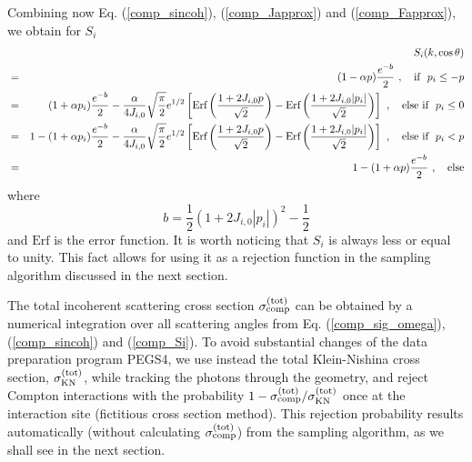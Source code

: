 Combining now Eq. (\ref{comp_sincoh}), (\ref{comp_Japprox}) and
(\ref{comp_Fapprox}),  we obtain for $S_i$
\begin{eqnarray}
\label{comp_Si}
& & S_i(k,\cos \theta) \nonumber \\
& = & (1 - \alpha p) {e^{-b} \over 2}~,\quad \mbox{if}~~p_i \le -p \nonumber \\
& = &
(1 + \alpha p_i) {e^{-b} \over 2} - {\alpha \over 4 J_{i,0}}
\sqrt{{\pi \over 2}} e^{1/2} \left[ \mbox{Erf} \left( 1 + 2 J_{i,0} p \over
\sqrt{2} \right) - \mbox{Erf} \left(  1 + 2 J_{i,0} |p_i|
\over \sqrt{2} \right) \right]~,\quad \mbox{else if}~~ p_i \le 0 \nonumber \\
& = &
1 - (1 + \alpha p_i) {e^{-b} \over 2} - {\alpha \over 4 J_{i,0}}
\sqrt{{\pi \over 2}} e^{1/2} \left[ \mbox{Erf} \left( 1 + 2 J_{i,0} p \over
\sqrt{2} \right) - \mbox{Erf} \left(  1 + 2 J_{i,0} |p_i|
\over \sqrt{2} \right) \right] ~,\quad \mbox{else if}~~ p_i < p \nonumber \\
& = &
1 - (1 + \alpha p) {e^{-b} \over 2} ~,\quad \mbox{else}
\end{eqnarray}
where
\begin{equation}
b = \frac{1}{2}\left(1 + 2 J_{i,0} |p_i| \right)^2 - \frac{1}{2}
\end{equation}
and $\mbox{Erf}$ is the error function. It is worth noticing that
$S_i$ is always less or equal to unity. This fact allows for
using it as a rejection function in the sampling algorithm discussed
in the next section.

The total incoherent scattering cross section $\sigma_{\rm comp}^{\rm (tot)}$
can be obtained
by a numerical integration over all scattering angles from
Eq. (\ref{comp_sig_omega}), (\ref{comp_sincoh}) and
(\ref{comp_Si}). To
avoid substantial changes of the data preparation program PEGS4,
we use instead the total Klein-Nishina cross section,
$\sigma_{\rm KN}^{\rm (tot)}$, while tracking the photons through
the geometry, and reject Compton interactions with the probability
$1-\sigma_{\rm comp}^{\rm (tot)}/\sigma_{\rm KN}^{\rm (tot)}$ once
at the interaction site (fictitious cross section method).
This rejection probability results automatically (without
calculating $\sigma_{\rm comp}^{\rm (tot)}$) from the sampling
algorithm, as we shall see in the next section.

